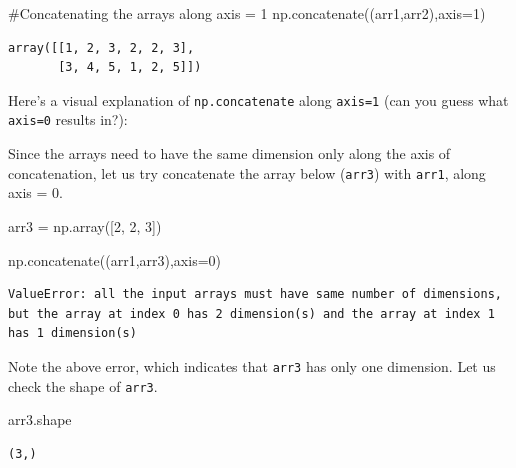 \documentclass[
  letterpaper,
  DIV=11,
  numbers=noendperiod]{scrreprt}
\newenvironment{Shaded}{\begin{snugshade}}{\end{snugshade}}
\newcommand{\CommentTok}[1]{\textcolor[rgb]{0.37,0.37,0.37}{#1}}
\newcommand{\DecValTok}[1]{\textcolor[rgb]{0.68,0.00,0.00}{#1}}
\newcommand{\NormalTok}[1]{\textcolor[rgb]{0.00,0.23,0.31}{#1}}
\newcommand{\OperatorTok}[1]{\textcolor[rgb]{0.37,0.37,0.37}{#1}}
\begin{document}
\begin{Shaded}
\begin{Highlighting}[]
\CommentTok{\#Concatenating the arrays along axis = 1}
\NormalTok{np.concatenate((arr1,arr2),axis}\OperatorTok{=}\DecValTok{1}\NormalTok{)}
\end{Highlighting}
\end{Shaded}

\begin{verbatim}
array([[1, 2, 3, 2, 2, 3],
       [3, 4, 5, 1, 2, 5]])
\end{verbatim}

Here's a visual explanation of \texttt{np.concatenate} along
\texttt{axis=1} (can you guess what \texttt{axis=0} results in?):

Since the arrays need to have the same dimension only along the axis of
concatenation, let us try concatenate the array below (\texttt{arr3})
with \texttt{arr1}, along axis = 0.

\begin{Shaded}
\begin{Highlighting}[]
\NormalTok{arr3 }\OperatorTok{=}\NormalTok{ np.array([}\DecValTok{2}\NormalTok{, }\DecValTok{2}\NormalTok{, }\DecValTok{3}\NormalTok{])}
\end{Highlighting}
\end{Shaded}

\begin{Shaded}
\begin{Highlighting}[]
\NormalTok{np.concatenate((arr1,arr3),axis}\OperatorTok{=}\DecValTok{0}\NormalTok{)}
\end{Highlighting}
\end{Shaded}

\begin{verbatim}
ValueError: all the input arrays must have same number of dimensions, but the array at index 0 has 2 dimension(s) and the array at index 1 has 1 dimension(s)
\end{verbatim}

Note the above error, which indicates that \texttt{arr3} has only one
dimension. Let us check the shape of \texttt{arr3}.

\begin{Shaded}
\begin{Highlighting}[]
\NormalTok{arr3.shape}
\end{Highlighting}
\end{Shaded}

\begin{verbatim}
(3,)
\end{verbatim}
\end{document}
